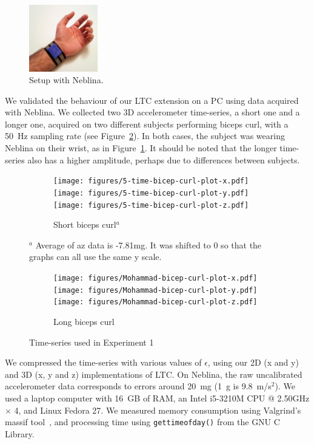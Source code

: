 \documentclass[10pt, conference, compsocconf]{IEEEtran}
\newcommand{\todo}[1]{\marginpar{\parbox{18mm}{\flushleft\tiny\color{red}\textbf{TODO}:
      #1}}}
\begin{document}
\begin{figure}
\includegraphics[width=3cm]{figures/neblina-wrist.png}
\caption{Setup with Neblina.}
\label{fig:neblina-wrist}
\end{figure}
We validated the behaviour of our LTC extension on a PC using data 
acquired with Neblina. We collected two 3D accelerometer time-series, a 
short one and a longer one, acquired on two different subjects 
performing biceps curl, with a 50~Hz sampling rate (see 
Figure~\ref{fig:datasets-1}). In both cases, the subject was wearing 
Neblina on their wrist, as in Figure~\ref{fig:neblina-wrist}. It should be noted that the longer 
time-series also has a higher amplitude, perhaps due to differences between 
subjects.

\begin{figure}
\centering
\begin{subfigure}{1.85\columnwidth}
\centering
\texttt{[image: figures/5-time-bicep-curl-plot-x.pdf]}
\texttt{[image: figures/5-time-bicep-curl-plot-y.pdf]}
\texttt{[image: figures/5-time-bicep-curl-plot-z.pdf]}
\caption{Short biceps curl$^a$}
\end{subfigure}

{\footnotesize $^a$ Average 
of az data is -7.81mg. It was shifted to 0 so that the graphs can all 
use the same y scale.}

\begin{subfigure}{1.85\columnwidth}
\centering
\texttt{[image: figures/Mohammad-bicep-curl-plot-x.pdf]}
\texttt{[image: figures/Mohammad-bicep-curl-plot-y.pdf]}
\texttt{[image: figures/Mohammad-bicep-curl-plot-z.pdf]}
\caption{Long biceps curl}
\end{subfigure}

\caption{Time-series used in Experiment 1}
\label{fig:datasets-1}
\end{figure}

We compressed the time-series with various values of $\epsilon$, using 
our 2D (x and y) and 3D (x, y and z) implementations of LTC. On 
Neblina, the raw uncalibrated accelerometer data corresponds to errors 
around 20~mg (1~g is 9.8~m/s$^2$). We used a 
laptop computer with 16~GB of RAM, an Intel i5-3210M CPU @ 2.50GHz 
$\times$ 4, and Linux Fedora 27. We measured memory consumption using 
Valgrind's massif 
tool~\cite{nethercote2006building}, 
and processing time using \texttt{gettimeofday()} from the GNU C 
Library. 
\end{document}
